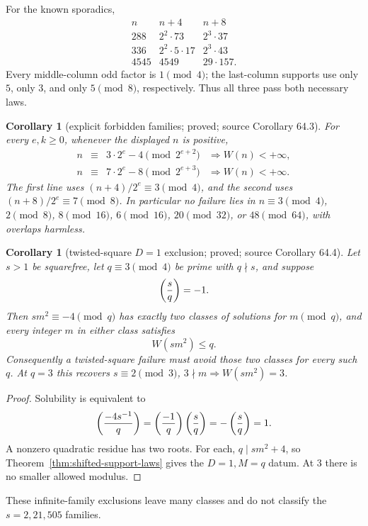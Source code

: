 \documentclass[10pt,reqno]{amsart}
\newtheorem{corollary}[theorem]{Corollary}
\theoremstyle{definition}
\newcommand{\1}{\mathbf 1}
\begin{document}
For the known sporadics,
\begin{equation}\tag{64.6}
\begin{array}{r|l|l}
n&n+4&n+8\\ \hline
288&2^2\cdot73&2^3\cdot37\\
336&2^2\cdot5\cdot17&2^3\cdot43\\
4545&4549&29\cdot157.
\end{array}
\end{equation}
Every middle-column odd factor is $1\pmod4$; the last-column supports use
only $5$, only $3$, and only $5\pmod8$, respectively.  Thus all three pass
both necessary laws.

\begin{corollary}[explicit forbidden families; proved; source Corollary 64.3]
\label{cor:dyadic-exclusions}
For every $e,k\geq0$, whenever the displayed $n$ is positive,
\begin{equation}\tag{64.7}
 \begin{array}{rcll}
 n&\equiv&3\cdot2^e-4\pmod {2^{e+2}}&\Longrightarrow W(n)<+\infty,\\
 n&\equiv&7\cdot2^e-8\pmod {2^{e+3}}&\Longrightarrow W(n)<+\infty.
 \end{array}
\end{equation}
The first line uses $(n+4)/2^e\equiv3\pmod4$, and the second uses
$(n+8)/2^e\equiv7\pmod8$.  In particular no failure lies in
$n\equiv3\pmod4$, $2\pmod8$, $8\pmod {16}$, $6\pmod {16}$,
$20\pmod {32}$, or $48\pmod {64}$, with overlaps harmless.
\end{corollary}

\begin{corollary}[twisted-square $D=1$ exclusion; proved; source Corollary 64.4]
\label{cor:twisted-D1-exclusion}
Let $s>1$ be squarefree, let $q\equiv3\pmod4$ be prime with $q\nmid s$,
and suppose
\[
                         \left({s\over q}\right)=-1.
\]
Then $sm^2\equiv-4\pmod q$ has exactly two classes of solutions for
$m\pmod q$, and every integer $m$ in either class satisfies
\begin{equation}\tag{64.8}
                         W(sm^2)\leq q.
\end{equation}
Consequently a twisted-square failure must avoid those two classes for every
such $q$.  At $q=3$ this recovers
$s\equiv2\pmod3$, $3\nmid m\Rightarrow W(sm^2)=3$.
\end{corollary}
\begin{proof}
Solubility is equivalent to
\[
 \left({-4s^{-1}\over q}\right)
 =\left({-1\over q}\right)\left({s\over q}\right)
 =-\left({s\over q}\right)=1.
\]
A nonzero quadratic residue has two roots.  For each, $q\mid sm^2+4$, so
Theorem~\ref{thm:shifted-support-laws} gives the $D=1,M=q$ datum.  At $3$
there is no smaller allowed modulus.
\end{proof}
These infinite-family exclusions leave many classes and do not classify the
$s=2,21,505$ families.
\end{document}
